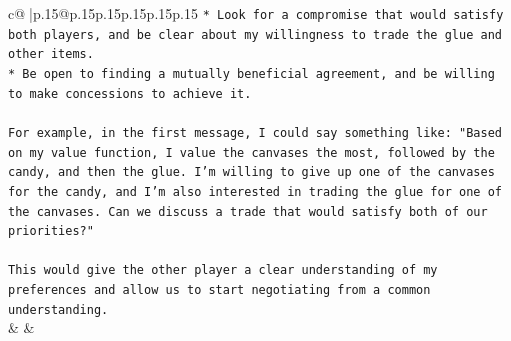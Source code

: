 \documentclass{article}
\begin{document}
{\begin{supertabular}{c@{$\;$}|p{.15\linewidth}@{}p{.15\linewidth}p{.15\linewidth}p{.15\linewidth}p{.15\linewidth}p{.15\linewidth}}
{{{\texttt{* Look for a compromise that would satisfy both players, and be clear about my willingness to trade the glue and other items.} \\
\texttt{* Be open to finding a mutually beneficial agreement, and be willing to make concessions to achieve it.} \\
\\ 
\texttt{For example, in the first message, I could say something like: "Based on my value function, I value the canvases the most, followed by the candy, and then the glue. I'm willing to give up one of the canvases for the candy, and I'm also interested in trading the glue for one of the canvases. Can we discuss a trade that would satisfy both of our priorities?"} \\
\\ 
\texttt{This would give the other player a clear understanding of my preferences and allow us to start negotiating from a common understanding.} \\
            }
        }
    }
    & & \\ \\


\end{supertabular}}
\end{document}

